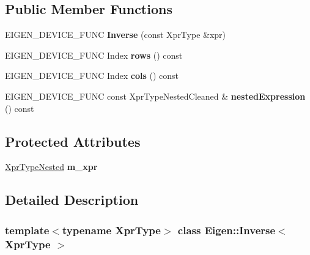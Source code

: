 \subsection*{Public Member Functions}
\begin{DoxyCompactItemize}
\item 
\mbox{\label{class_eigen_1_1_inverse_ac3dcdb58c1416882e33b90c5547589c0}} 
E\+I\+G\+E\+N\+\_\+\+D\+E\+V\+I\+C\+E\+\_\+\+F\+U\+NC {\bfseries Inverse} (const Xpr\+Type \&xpr)
\item 
\mbox{\label{class_eigen_1_1_inverse_af41ff0c72ffb6782474bab6e1ec2ac11}} 
E\+I\+G\+E\+N\+\_\+\+D\+E\+V\+I\+C\+E\+\_\+\+F\+U\+NC Index {\bfseries rows} () const
\item 
\mbox{\label{class_eigen_1_1_inverse_a506af9d762f0285fe8bd719fff034e4d}} 
E\+I\+G\+E\+N\+\_\+\+D\+E\+V\+I\+C\+E\+\_\+\+F\+U\+NC Index {\bfseries cols} () const
\item 
\mbox{\label{class_eigen_1_1_inverse_ab112d1c3a08075a9f978df4ced8e2152}} 
E\+I\+G\+E\+N\+\_\+\+D\+E\+V\+I\+C\+E\+\_\+\+F\+U\+NC const Xpr\+Type\+Nested\+Cleaned \& {\bfseries nested\+Expression} () const
\end{DoxyCompactItemize}
\subsection*{Protected Attributes}
\begin{DoxyCompactItemize}
\item 
\mbox{\label{class_eigen_1_1_inverse_a702bb2d052c32edff4d7cf646b3bf039}} 
\mbox{\hyperlink{struct_eigen_1_1internal_1_1true__type}{Xpr\+Type\+Nested}} {\bfseries m\+\_\+xpr}
\end{DoxyCompactItemize}


\subsection{Detailed Description}
\subsubsection*{template$<$typename Xpr\+Type$>$\newline
class Eigen\+::\+Inverse$<$ Xpr\+Type $>$}

